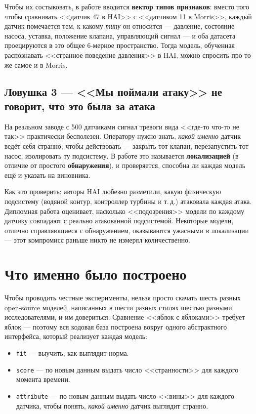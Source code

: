 \documentclass[11pt,a4paper]{article}
\newcommand{\code}[1]{\texttt{#1}}
\begin{document}
Чтобы их состыковать, в работе вводится \textbf{вектор типов признаков}: вместо того чтобы сравнивать <<датчик 47 в HAI>> с <<датчиком 11 в Morris>>, каждый датчик помечается тем, к какому \emph{типу} он относится --- давление, состояние насоса, уставка, положение клапана, управляющий сигнал --- и оба датасета проецируются в это общее 6-мерное пространство. Тогда модель, обученная распознавать <<странное поведение давления>> в HAI, можно спросить про то же самое и в Morris.

\subsection{Ловушка 3 --- <<Мы поймали атаку>> не говорит, что это была за атака}

На реальном заводе с 500 датчиками сигнал тревоги вида <<где-то что-то не так>> практически бесполезен. Оператору нужно знать, \emph{какой именно} датчик ведёт себя странно, чтобы действовать --- закрыть тот клапан, перезапустить тот насос, изолировать ту подсистему. В работе это называется \textbf{локализацией} (в отличие от простого \textbf{обнаружения}), и проверяется, способна ли каждая модель ещё и указать на виновника.

Как это проверить: авторы HAI любезно разметили, какую физическую подсистему (водяной контур, контроллер турбины и т.\,д.) атаковала каждая атака. Дипломная работа оценивает, насколько <<подозрения>> модели по каждому датчику совпадают с реально атакованной подсистемой. Некоторые модели, отлично справляющиеся с обнаружением, оказываются ужасными в локализации --- этот компромисс раньше никто не измерял количественно.

\section{Что именно было построено}

Чтобы проводить честные эксперименты, нельзя просто скачать шесть разных open-source моделей, написанных в шести разных стилях шестью разными исследователями, и им довериться. Сравнение <<яблок с яблоками>> требует яблок --- поэтому вся кодовая база построена вокруг одного абстрактного интерфейса, который реализует каждая модель:

\begin{itemize}
  \item \code{fit} --- выучить, как выглядит норма.
  \item \code{score} --- по новым данным выдать число <<странности>> для каждого момента времени.
  \item \code{attribute} --- по новым данным выдать число <<вины>> для каждого датчика, чтобы понять, \emph{какой именно} датчик выглядит странно.
\end{itemize}
\end{document}
